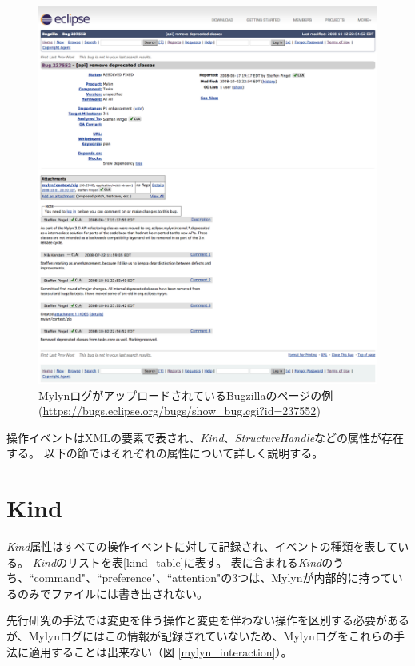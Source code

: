 \documentclass[a4paper]{jsbook}
\begin{document}
\begin{figure}[tb]
  \centering
  \includegraphics[width = \linewidth]{resource/bugzilla_webpage.png}
  \caption{MylynログがアップロードされているBugzillaのページの例 (\url{https://bugs.eclipse.org/bugs/show_bug.cgi?id=237552})}
  \label{bugzilla_webpage}
\end{figure}


操作イベントはXMLの要素で表され、{\it Kind}、{\it StructureHandle}などの属性が存在する。
以下の節ではそれぞれの属性について詳しく説明する。

\section{Kind}\label{kind_sec}
{\it Kind}属性はすべての操作イベントに対して記録され、イベントの種類を表している。
{\it Kind}のリストを表\ref{kind_table}に表す。
表に含まれる{\it Kind}のうち、``command"、``preference"、``attention"の3つは、Mylynが内部的に持っているのみでファイルには書き出されない。

先行研究\cite{6233415,KatoJapanese:2011,ss2012-76,ss2013-84,Yamamori:2016}の手法では変更を伴う操作と変更を伴わない操作を区別する必要があるが、Mylynログにはこの情報が記録されていないため、Mylynログをこれらの手法に適用することは出来ない（図 \ref{mylyn_interaction}）。
\end{document}
